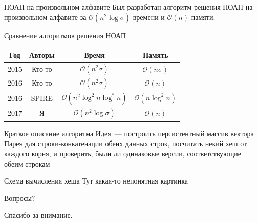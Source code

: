 \documentclass[hyperref=unicode,graphics=pdflatex,12pt]{beamer}
\begin{document}
\begin{frame}{НОАП на произвольном алфавите}
Был разработан алгоритм решения НОАП на произвольном алфавите
за $\mathcal{O}(n^2 \log \sigma)$ времени и $\mathcal{O}(n)$ памяти.

\vspace{0.5cm}

Сравнение алгоритмов решения НОАП

\begin{center}
\begin{tabular}{|c|c|c|c|}
\hline
Год & Авторы & Время & Память \\
\hline
2015 & Кто-то & $\mathcal{O}(n^2 \sigma)$ & $\mathcal{O}(n \sigma)$ \\
\hline
2016 & Кто-то & $\mathcal{O}(n^2 \sigma)$ & $\mathcal{O}(n)$ \\
\hline
2016 & SPIRE & $\mathcal{O}(n^2 \log^2 n \log^* n)$ & $\mathcal{O}(n \log^2 n)$ \\
\hline
2017 & Я & $\mathcal{O}(n^2 \log \sigma)$ & $\mathcal{O}(n)$ \\
\hline
\end{tabular}
\end{center}
\end{frame}
      
\begin{frame}{Краткое описание алгоритма}
\vspace{0.5cm}
Идея~--- построить персистентный массив вектора Парея для строки-конкатенации обеих данных строк,
посчитать некий хеш от каждого корня, и проверить, были ли одинаковые версии, соответствующие обеим строкам
\end{frame}

\begin{frame}{Схема вычисления хеша}
Тут какая-то непонятная картинка
\end{frame}

\begin{frame}{Вопросы?}
\begin{center}
Спасибо за внимание.
\end{center}
\end{frame}
\end{document}
